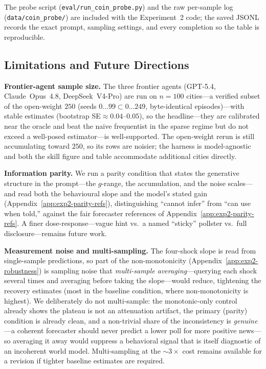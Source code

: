 The probe script (\texttt{eval/run\_coin\_probe.py}) and the raw per-sample log
(\texttt{data/coin\_probe/}) are included with the Experiment~2 code; the saved JSONL records the
exact prompt, sampling settings, and every completion so the table is reproducible.

\subsection{Limitations and Future Directions}
\label{app:exp2-limitations}

\textbf{Frontier-agent sample size.}  The three frontier agents (GPT-5.4, Claude~Opus~4.8,
DeepSeek~V4-Pro) are run on $n{=}100$ cities---a verified subset of the open-weight $250$ (seeds
$0\ldots99\subset0\ldots249$, byte-identical episodes)---with stable estimates (bootstrap
SE${\approx}0.04$--$0.05$), so the headline---they are calibrated near the oracle and beat the naive
frequentist in the sparse regime but do not exceed a well-posed estimator---is well-supported.  The
open-weight rerun is still accumulating toward $250$, so its rows are noisier; the harness is
model-agnostic and both the skill figure and table accommodate additional cities directly.

\textbf{Information parity.}  We run a parity condition that states the generative structure in the
prompt---the $g$-range, the accumulation, and the noise scales---and read both the behavioural
slope and the model's stated gain (Appendix~\ref{app:exp2-parity-refs}), distinguishing ``cannot
infer'' from ``can use when told,'' against the fair forecaster references of
Appendix~\ref{app:exp2-parity-refs}.  A finer dose-response---vague hint vs.\ a named ``sticky''
pollster vs.\ full disclosure---remains future work.

\textbf{Measurement noise and multi-sampling.}  The four-shock slope is read from single-sample
predictions, so part of the non-monotonicity (Appendix~\ref{app:exp2-robustness}) is sampling noise
that \emph{multi-sample averaging}---querying each shock several times and averaging before taking
the slope---would reduce, tightening the recovery estimates (most in the baseline condition, where
non-monotonicity is highest).  We deliberately do not multi-sample: the monotonic-only control
already shows the plateau is not an attenuation artifact, the primary (parity) condition is already
clean, and a non-trivial share of the inconsistency is \emph{genuine}---a coherent forecaster
should never predict a lower poll for more positive news---so averaging it away would suppress a
behavioral signal that is itself diagnostic of an incoherent world model.  Multi-sampling at the
$\sim$$3\times$ cost remains available for a revision if tighter baseline estimates are required.


